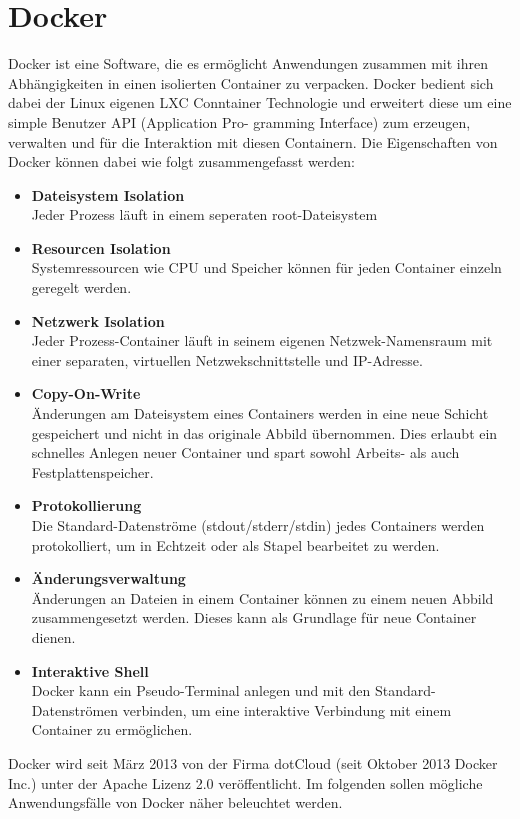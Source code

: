 \section{Docker}
\label{sec:docker}
Docker ist eine Software, die es ermöglicht Anwendungen zusammen mit ihren Abhängigkeiten in einen isolierten Container zu verpacken. Docker bedient sich dabei der Linux eigenen LXC Conntainer Technologie und erweitert diese um eine simple Benutzer API (Application Pro-
gramming Interface) zum erzeugen, verwalten und für die Interaktion mit diesen Containern.
Die Eigenschaften von Docker können dabei wie folgt zusammengefasst werden: \cite{abel_docker:_2013}
\begin{itemize}
 
      \item \textbf{Dateisystem Isolation} \\
Jeder Prozess läuft in einem seperaten root-Dateisystem
      \item \textbf{Resourcen Isolation} \\
Systemressourcen wie CPU und Speicher können für jeden Container einzeln geregelt werden.
      \item \textbf{Netzwerk Isolation} \\
Jeder Prozess-Container läuft in seinem eigenen Netzwek-Namensraum mit einer separaten, 			virtuellen Netzwekschnittstelle und IP-Adresse.
      \item \textbf{Copy-On-Write} \\
Änderungen am Dateisystem eines Containers werden in eine neue Schicht gespeichert und nicht in das originale Abbild übernommen. Dies erlaubt ein schnelles Anlegen neuer Container und spart sowohl Arbeits- als auch Festplattenspeicher.
      \item \textbf{Protokollierung} \\
Die Standard-Datenströme (stdout/stderr/stdin) jedes Containers werden protokolliert, um in Echtzeit oder als Stapel bearbeitet zu werden.
	  \item \textbf{Änderungsverwaltung} \\
Änderungen an Dateien in einem Container können zu einem neuen Abbild zusammengesetzt werden. Dieses kann als Grundlage für neue Container dienen.
	  \item \textbf{Interaktive Shell} \\
Docker kann ein Pseudo-Terminal anlegen und mit den Standard-Datenströmen verbinden, um eine interaktive Verbindung mit einem Container zu ermöglichen.
\end{itemize}
Docker wird seit März 2013 von der Firma dotCloud (seit Oktober 2013 Docker
Inc.) unter der Apache Lizenz 2.0 veröffentlicht.\cite{github_dotcloud/docker_2013}
Im folgenden sollen mögliche Anwendungsfälle von Docker näher beleuchtet werden.
